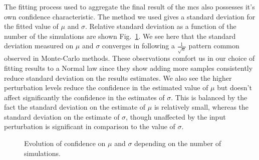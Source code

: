 \documentclass[10pt,conference,compsocconf]{IEEEtran}
\begin{document}
The fitting process used to aggregate the final result of the \ac{mcs} also 
possesses it's own confidence characteristic. The method we used
gives a standard deviation for the fitted value of $\mu$ and $\sigma$. Relative
standard deviation as a function of the number of the simulations are shown
Fig.~\ref{fig:confidence}. We see here that the standard deviation measured on
$\mu$ and $\sigma$ converges in following a $\frac{1}{\sqrt{n}}$ pattern
common observed in Monte-Carlo methods. These observations comfort us in our
choice of fitting results to a Normal law since they show adding more samples
consistently reduce standard deviation on the results estimates. We also see the
higher perturbation levels reduce the confidence in the estimated value of $\mu$
but doesn't affect significantly the confidence in the estimates of $\sigma$.
This is balanced by the fact the standard deviation on the estimate of $\mu$
is relatively small, whereas the standard deviation on the estimate of
$\sigma$, though unaffected by the input perturbation is significant in comparison
to the value of $\sigma$.

\begin{figure}
	\centering
	\resizebox{0.5\textwidth}{!}{%
		
	}
	\resizebox{0.5\textwidth}{!}{%
		
	}
	\caption{Evolution of confidence on $\mu$ and $\sigma$ depending on the
	number of simulations.}
	\label{fig:confidence}
\end{figure}





\end{document}
